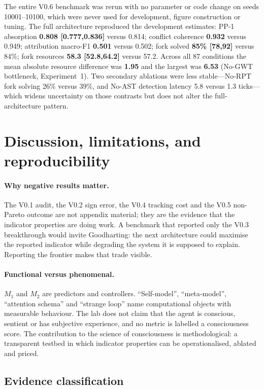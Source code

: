 \documentclass[11pt,a4paper]{article}
\begin{document}
The entire V0.6 benchmark was rerun with no parameter or code change on seeds 10001--10100, which
were never used for development, figure construction or tuning. The full architecture reproduced the
development estimates: PP-1 absorption \textbf{0.808 [0.777,0.836]} versus 0.814; conflict coherence
\textbf{0.932} versus 0.949; attribution macro-F1 \textbf{0.501} versus 0.502; fork solved
\textbf{85\% [78,92]} versus 84\%; fork resources \textbf{58.3 [52.8,64.2]} versus 57.2. Across all 87
conditions the mean absolute resource difference was \textbf{1.95} and the largest was \textbf{6.53}
(No-GWT bottleneck, Experiment~1). Two secondary ablations were less stable---No-RPT fork solving
26\% versus 39\%, and No-AST detection latency 5.8 versus 1.3 ticks---which widens uncertainty on
those contrasts but does not alter the full-architecture pattern.

\section{Discussion, limitations, and reproducibility}

\paragraph{Why negative results matter.}
The V0.1 audit, the V0.2 sign error, the V0.4 tracking cost and the V0.5 non-Pareto outcome are not appendix material; they are the evidence that the indicator properties are doing work. A benchmark that reported only the V0.3 breakthrough would invite Goodharting: the next architecture could maximise the reported indicator while degrading the system it is supposed to explain. Reporting the frontier makes that trade visible.

\paragraph{Functional versus phenomenal.}
$M_1$ and $M_2$ are predictors and controllers. ``Self-model'', ``meta-model'', ``attention schema'' and ``strange loop'' name computational objects with measurable behaviour. The lab does not claim that the agent is conscious, sentient or has subjective experience, and no metric is labelled a consciousness score. The contribution to the science of consciousness is methodological: a transparent testbed in which indicator properties can be operationalised, ablated and priced.

\subsection{Evidence classification}
\end{document}
